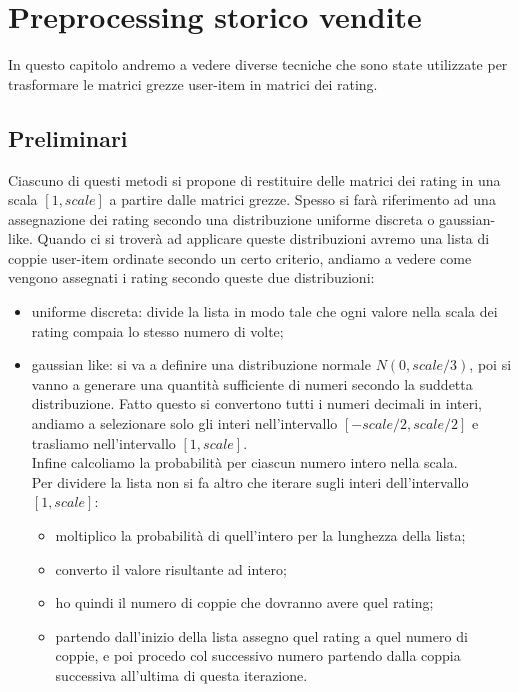 
\hypertarget{(chap:capitolo5)}{}
\chapter{Preprocessing storico vendite}
In questo capitolo andremo a vedere diverse tecniche che sono state utilizzate per trasformare le matrici grezze user-item in matrici dei rating.\\

\section{Preliminari}
Ciascuno di questi metodi si propone di restituire delle matrici dei rating in una scala $[1,scale]$ a partire dalle matrici grezze. Spesso si farà riferimento ad una assegnazione dei rating secondo una distribuzione uniforme discreta o gaussian-like. Quando ci si troverà ad applicare queste distribuzioni avremo una lista di coppie user-item ordinate secondo un certo criterio, andiamo a vedere come vengono assegnati i rating secondo queste due distribuzioni:
\begin{itemize}
    \item uniforme discreta: divide la lista in modo tale che ogni valore nella scala dei rating compaia lo stesso numero di volte;
    \item gaussian like: si va a definire una distribuzione normale $N(0,scale/3)$, poi si vanno a generare una quantità sufficiente di numeri secondo la suddetta distribuzione. Fatto questo si convertono tutti i numeri decimali in interi, andiamo a selezionare solo gli interi nell'intervallo $[-scale/2,scale/2]$ e trasliamo nell'intervallo $[1,scale]$.\\
    Infine calcoliamo la probabilità per ciascun numero intero nella scala.\\
    Per dividere la lista non si fa altro che iterare sugli interi dell'intervallo $[1,scale]$:
    \begin{itemize}
        \item moltiplico la probabilità di quell'intero per la lunghezza della lista;
        \item converto il valore risultante ad intero;
        \item ho quindi il numero di coppie che dovranno avere quel rating;
        \item partendo dall'inizio della lista assegno quel rating a quel numero di coppie, e poi procedo col successivo numero partendo dalla coppia successiva all'ultima di questa iterazione.
    \end{itemize}
\end{itemize}

